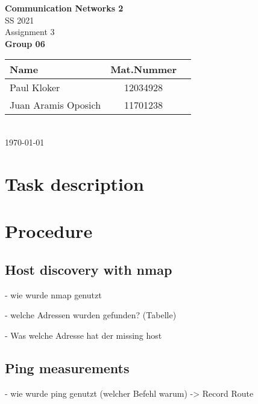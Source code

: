 \documentclass[parskip=full]{scrartcl}
\begin{document}
\begin{titlepage}
    \centering
    \vspace*{2cm}
    {\Huge \textbf{Communication Networks 2}}\\
    SS 2021\\
    \vspace*{1cm}
    {\Large Assignment 3}
    \\\vspace*{3cm}
    {\Large \textbf{Group 06}}\\
    \vspace*{1cm}
    {\large 
        \begin{tabular}{l c c}
            Name & Mat.Nummer \\ \hline
            Paul Kloker & 12034928 \\
            Juan Aramis Oposich & 11701238
        \end{tabular}
    }
    \\\vspace*{7cm}
    \today
\end{titlepage}

\section{Task description} \label{sec:task}

\section{Procedure} \label{sec:procedure}
\subsection{Host discovery with nmap} \label{subsec:nmap}
- wie wurde nmap genutzt

- welche Adressen wurden gefunden? (Tabelle)

- Was welche Adresse hat der missing host


\subsection{Ping measurements} \label{subsec:ping}
- wie wurde ping genutzt (welcher Befehl warum) -> Record Route 
\end{document}
